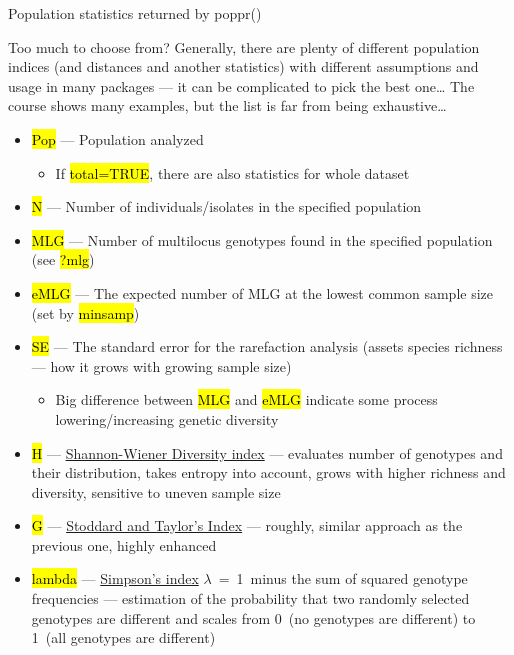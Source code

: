 \documentclass[compress, ucs, xelatex, 11pt, xcolor=svgnames,
	hyperref={
		bookmarks=true,
		unicode=true,
		colorlinks=true,
		pdftitle={Molecular data in R},
		plainpages=false,
		pdfauthor={Vojtech Zeisek},
		pdfsubject={Course about phylogeny and evolution in R},
		pdfcreator={XeLaTeX},
		pdfkeywords={R, evolution, phylogeny, molecular data},
		linkcolor=Tomato,
		anchorcolor=SaddleBrown,
		citecolor=Goldenrod,
		filecolor=DarkMagenta,
		menucolor=Sienna,
		urlcolor=DarkTurquoise,
		pdftex},
	url={hyphens, lowtilde} %
	]{beamer}
\renewcommand{\texttt}[1]{\hl{\ttfamily #1}}
\begin{document}
\begin{frame}[allowframebreaks]{Population statistics returned by poppr()}
	\begin{block}{Too much to choose from?}
		Generally, there are plenty of different population indices (and distances and another statistics) with different assumptions and usage in many packages --- it can be complicated to pick the best one\ldots{ }The course shows many examples, but the list is far from being exhaustive\ldots
	\end{block}
	\begin{itemize}
		\item \texttt{Pop} --- Population analyzed
		\begin{itemize}
			\item If \texttt{total=TRUE}, there are also statistics for whole dataset
		\end{itemize}
		\item \texttt{N} --- Number of individuals/isolates in the specified population
		\item \texttt{MLG} --- Number of multilocus genotypes found in the specified population (see \texttt{?mlg})
		\item \texttt{eMLG} --- The expected number of MLG at the lowest common sample size (set by \texttt{minsamp})
		\item \texttt{SE} --- The standard error for the rarefaction analysis (assets species richness --- how it grows with growing sample size)
		\begin{itemize}
			\item Big difference between \texttt{MLG} and \texttt{eMLG} indicate some process lowering/increasing genetic diversity
		\end{itemize}
		\item \texttt{H} --- \href{https://en.wikipedia.org/wiki/Diversity_index\#Shannon_index}{Shannon-Wiener Diversity index} --- evaluates number of genotypes and their distribution, takes entropy into account, grows with higher richness and diversity, sensitive to uneven sample size
		\item \texttt{G} --- \href{http://www.genetics.org/content/118/4/705}{Stoddard and Taylor's Index} --- roughly, similar approach as the previous one, highly enhanced
		\item \texttt{lambda} --- \href{https://en.wikipedia.org/wiki/Diversity_index\#Simpson_index}{Simpson's index} $\lambda$~=~1~minus the sum of squared genotype frequencies --- estimation of the probability that two randomly selected genotypes are different and scales from 0~(no genotypes are different) to 1~(all genotypes are different)

\end{itemize}
\end{frame}
\end{document}
